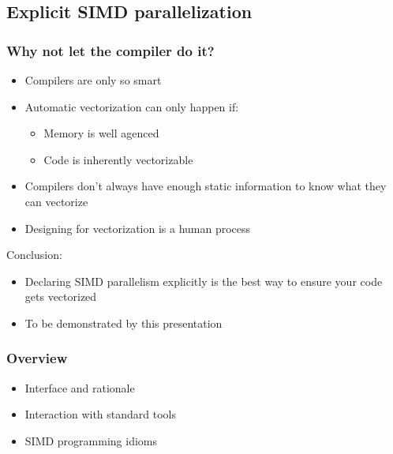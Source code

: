 \documentclass{beamer}
\begin{document}
\subsection{Explicit SIMD parallelization}
\begin{frame}
	\frametitle{Why not let the compiler do it?}
	
	\begin{itemize}
		\item Compilers are only so smart
		\item Automatic vectorization can only happen if:
		\begin{itemize}
			\item Memory is well agenced
			\item Code is inherently vectorizable
		\end{itemize}
	\end{itemize}
	
	\begin{itemize}
		\item Compilers don't always have enough static information to know what they can vectorize
		\item Designing for vectorization is a human process
	\end{itemize}
	
	Conclusion:
	\begin{itemize}
		\item Declaring SIMD parallelism explicitly is the best way
              to ensure your code gets vectorized
        \item To be demonstrated by this presentation
    \end{itemize}

\end{frame}

\begin{frame}
	\frametitle{Overview}
	
	\begin{itemize}
		\item Interface and rationale
		\item Interaction with standard tools
		\item SIMD programming idioms
	\end{itemize}
\end{frame}

\end{document}
